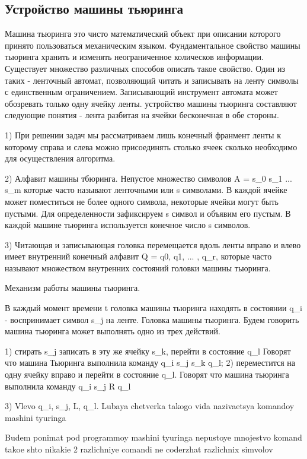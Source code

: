 \subsection{Устройство машины тьюринга}

Машина тьюринга это чисто математический объект при описании которого принято пользоваться механическим языком. Фундаментальное свойство машины тьюринга хранить и изменять неограниченное колическов информации. Существует множество различных способов описать такое свойство. Один из таких - ленточный автомат, позволяющий читать и записывать на ленту символы с единственным ограничением. Записывающий инструмент автомата может обозревать только одну ячейку ленты. устройство машины тьюринга составляют следующие понятия - лента разбитая на ячейки бесконечная в обе стороны.

1) При решении задач мы рассматриваем лишь конечный франмент ленты к которому справа и слева можно присоединять столько ячеек сколько необходимо для осуществления алгоритма.

2) Алфавит машины тбюринга. Непустое множество символов A = {s_0 s_1 ... s_m} которые часто называют ленточными или s символами. В каждой ячейке может поместиться не более одного символа, некоторые ячейки могут быть пустыми. Для определенности зафиксируем s символ и объявим его пустым. В каждой машине тьюринга используется конечное число s символов.

3) Читающая и записывающая головка перемещается вдоль ленты вправо и влево имеет внутренний конечный алфавит Q = {q0, q1, ... , q_r}, которые часто называют множеством внутренних состояний головки машины тьюринга.

Механизм работы машины тьюринга.

В каждый момент времени t головка машины тьюринга находять в состоянии q_i - воспринимает символ s_j на ленте. 
Головка машины тьюринга. Будем говорить машина тьюринга может выполнять одно из трех действий.

1) стирать s_j записать в эту же ячейку s_k, перейти в состояние q_l
Говорят что машина Тьюринга выполнила команду q_i s_j s_k q_l;
2) переместится на одну ячейку вправо и перейти в состояние q_l. Говорят что машина тьюринга выполнила команду q_i s_j R q_l

3) Vlevo
q_i, s_j, L, q_l.
Lubaya chetverka takogo vida nazivaetsya komandoy mashini tyuringa

Budem ponimat pod programmoy mashini tyuringa nepustoye mnojestvo komand takoe shto nikakie 2 razlichniye comandi ne coderzhat razlichnix simvolov


